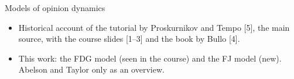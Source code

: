 \documentclass[10pt, aspectratio=169]{beamer}
\begin{document}
\begin{frame}[label=m-models]{Models of opinion dynamics}
  \vspace{4mm}
  \raggedright
  \small
  \begin{itemize}
    \item Historical account of the tutorial by Proskurnikov and Tempo [5], the main source,
          with the course slides [1--3] and the book by Bullo [4].
    \item This work: the \alert{FDG model} (seen in the course) and the \alert{FJ model}
          (new). Abelson and Taylor only as an overview.
  \end{itemize}
\end{frame}

\end{document}
